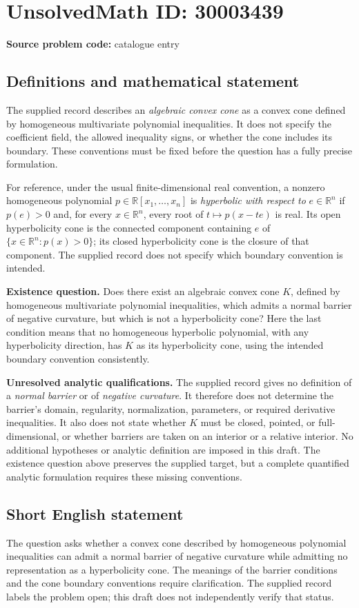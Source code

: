 \documentclass[11pt]{article}
\newcommand{\R}{\mathbb{R}}
\begin{document}
\section*{UnsolvedMath ID: 30003439}
\textbf{Source problem code:} catalogue entry
\subsection{Definitions and mathematical statement}
The supplied record describes an \emph{algebraic convex cone} as a convex cone defined by homogeneous multivariate polynomial inequalities. It does not specify the coefficient field, the allowed inequality signs, or whether the cone includes its boundary. These conventions must be fixed before the question has a fully precise formulation.

For reference, under the usual finite-dimensional real convention, a nonzero homogeneous polynomial \(p\in\R[x_1,\ldots,x_n]\) is \emph{hyperbolic with respect to} \(e\in\R^n\) if \(p(e)>0\) and, for every \(x\in\R^n\), every root of \(t\mapsto p(x-te)\) is real. Its open hyperbolicity cone is the connected component containing \(e\) of \(\{x\in\R^n:p(x)>0\}\); its closed hyperbolicity cone is the closure of that component. The supplied record does not specify which boundary convention is intended.

\textbf{Existence question.} Does there exist an algebraic convex cone \(K\), defined by homogeneous multivariate polynomial inequalities, which admits a normal barrier of negative curvature, but which is not a hyperbolicity cone? Here the last condition means that no homogeneous hyperbolic polynomial, with any hyperbolicity direction, has \(K\) as its hyperbolicity cone, using the intended boundary convention consistently.

\textbf{Unresolved analytic qualifications.} The supplied record gives no definition of a \emph{normal barrier} or of \emph{negative curvature}. It therefore does not determine the barrier's domain, regularity, normalization, parameters, or required derivative inequalities. It also does not state whether \(K\) must be closed, pointed, or full-dimensional, or whether barriers are taken on an interior or a relative interior. No additional hypotheses or analytic definition are imposed in this draft. The existence question above preserves the supplied target, but a complete quantified analytic formulation requires these missing conventions.
\subsection{Short English statement}
The question asks whether a convex cone described by homogeneous polynomial inequalities can admit a normal barrier of negative curvature while admitting no representation as a hyperbolicity cone. The meanings of the barrier conditions and the cone boundary conventions require clarification. The supplied record labels the problem open; this draft does not independently verify that status.
\end{document}
